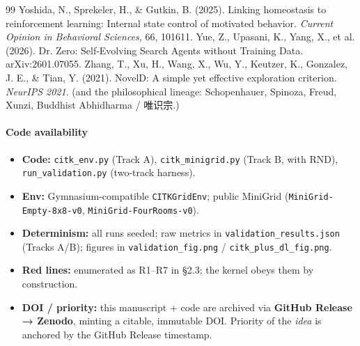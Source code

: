 \documentclass[11pt]{article}
\begin{document}
\begin{thebibliography}{99}
Yoshida, N., Sprekeler, H., \& Gutkin, B. (2025). Linking homeostasis to reinforcement learning: Internal state control of motivated behavior. \emph{Current Opinion in Behavioral Sciences}, 66, 101611.
Yue, Z., Upasani, K., Yang, X., et al. (2026). Dr. Zero: Self-Evolving Search Agents without Training Data. arXiv:2601.07055.
Zhang, T., Xu, H., Wang, X., Wu, Y., Keutzer, K., Gonzalez, J. E., \& Tian, Y. (2021). NovelD: A simple yet effective exploration criterion. \emph{NeurIPS 2021}.
(and the philosophical lineage: Schopenhauer, Spinoza, Freud, Xunzi, Buddhist Abhidharma / 唯识宗.)
\end{thebibliography}
\paragraph{Code availability}
\begin{itemize}
\item \textbf{Code:} \texttt{citk\_env.py} (Track A), \texttt{citk\_minigrid.py} (Track B, with RND), \texttt{run\_validation.py} (two-track harness).
\item \textbf{Env:} Gymnasium-compatible \texttt{CITKGridEnv}; public MiniGrid (\texttt{MiniGrid-Empty-8x8-v0}, \texttt{MiniGrid-FourRooms-v0}).
\item \textbf{Determinism:} all runs seeded; raw metrics in \texttt{validation\_results.json} (Tracks A/B); figures in \texttt{validation\_fig.png} / \texttt{citk\_plus\_dl\_fig.png}.
\item \textbf{Red lines:} enumerated as R1–R7 in §2.3; the kernel obeys them by construction.
\item \textbf{DOI / priority:} this manuscript + code are archived via \textbf{GitHub Release → Zenodo}, minting a citable, immutable DOI. Priority of the \emph{idea} is anchored by the GitHub Release timestamp.
\end{itemize}
\end{document}

